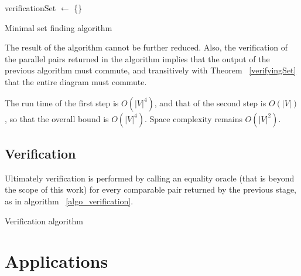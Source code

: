 \documentclass[sigplan,review,anonymous]{acmart}
\begin{document}
{\begin{algorithm}
verificationSet $\gets$ \{\}\;
\;
\caption{Minimal set finding algorithm}
\label{algo_online_minimal}
\end{algorithm}

The result of the algorithm cannot be further reduced.
Also, the verification of the parallel pairs returned in the algorithm implies that the output of the previous algorithm must commute, and transitively with Theorem ~\ref{verifyingSet} that the entire diagram must commute.

The run time of the first step is $O(|V|^4)$, and that of the second step is $O(|V|)$, so that the overall bound is $O(|V|^4)$.
Space complexity remains $O(|V|^2)$.

\subsection{Verification}
Ultimately verification is performed by calling an equality oracle (that is beyond the scope of this work) for every comparable pair returned by the previous stage, as in algorithm ~\ref{algo_verification}.

\begin{algorithm}
\DontPrintSemicolon
{}
\;
\caption{Verification algorithm}\label{algo_verification}
\end{algorithm}

\section{Applications}


}
\end{document}

